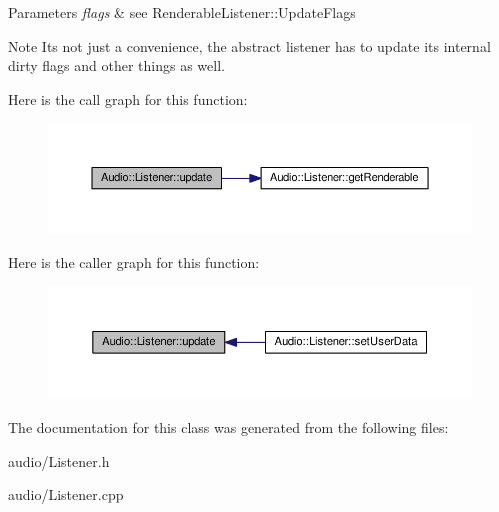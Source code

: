 \begin{DoxyParams}{Parameters}
{\em flags} & see Renderable\+Listener\+::\+Update\+Flags \\
\hline
\end{DoxyParams}
\begin{DoxyNote}{Note}
It\textquotesingle{}s not just a convenience, the abstract listener has to update its internal dirty flags and other things as well. 
\end{DoxyNote}


Here is the call graph for this function\+:
\nopagebreak
\begin{figure}[H]
\begin{center}
\leavevmode
\includegraphics[width=350pt]{db/de1/classAudio_1_1Listener_a141c18f3bba8e9bf87f99197af98fc19_cgraph}
\end{center}
\end{figure}




Here is the caller graph for this function\+:
\nopagebreak
\begin{figure}[H]
\begin{center}
\leavevmode
\includegraphics[width=350pt]{db/de1/classAudio_1_1Listener_a141c18f3bba8e9bf87f99197af98fc19_icgraph}
\end{center}
\end{figure}




The documentation for this class was generated from the following files\+:\begin{DoxyCompactItemize}
\item 
audio/Listener.\+h\item 
audio/Listener.\+cpp\end{DoxyCompactItemize}
